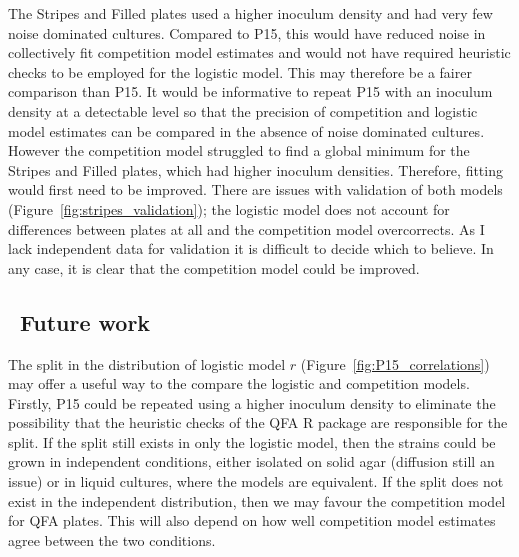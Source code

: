 The Stripes and Filled plates used a higher inoculum density and had
very few noise dominated cultures. Compared to P15, this would have
reduced noise in collectively fit competition model estimates and
would not have required heuristic checks to be employed for the
logistic model. This may therefore be a fairer comparison than P15. It
would be informative to repeat P15 with an inoculum density at a
detectable level so that the precision of competition and logistic
model estimates can be compared in the absence of noise dominated
cultures. However the competition model struggled to find a global
minimum for the Stripes and Filled plates, which had higher inoculum
densities. Therefore, fitting would first need to be improved.
There are issues with validation of both models
(Figure~\ref{fig:stripes_validation}); the logistic model does not
account for differences between plates at all and the competition
model overcorrects. As I lack independent data for validation it is
difficult to decide which to believe.
In any case, it is clear that the competition model could be improved.


\subsection{\thesubsection~Future work}

The split in the distribution of logistic model \(r\)
(Figure~\ref{fig:P15_correlations}) may offer a useful way to the
compare the logistic and competition models. Firstly, P15 could be
repeated using a higher inoculum density to eliminate the possibility
that the heuristic checks of the QFA R package are responsible for the
split. If the split still exists in only the logistic model, then the
strains could be grown in independent conditions, either isolated on
solid agar (diffusion still an issue) or in liquid cultures, where the
models are equivalent. If the split does not exist in the independent
distribution, then we may favour the competition model for QFA
plates. This will also depend on how well competition model estimates
agree between the two conditions.

